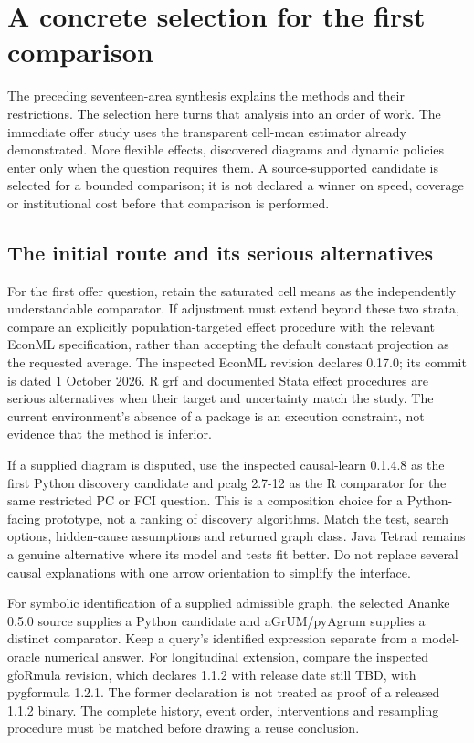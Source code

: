 \chapter{A concrete selection for the first comparison}
\label{rewrite:software-selection}

The preceding seventeen-area synthesis explains the methods and their
restrictions. The selection here turns that analysis into an order of work.
The immediate offer study uses the transparent cell-mean estimator already
demonstrated. More flexible effects, discovered diagrams and dynamic policies
enter only when the question requires them. A source-supported candidate is
selected for a bounded comparison; it is not declared a winner on speed,
coverage or institutional cost before that comparison is performed.

\section{The initial route and its serious alternatives}
For the first offer question, retain the saturated cell means as the
independently understandable comparator. If adjustment must extend beyond
these two strata, compare an explicitly population-targeted effect procedure
with the relevant EconML specification, rather than accepting the default
constant projection as the requested average. The inspected EconML revision
declares 0.17.0; its commit is dated 1 October 2026. R grf and documented
Stata effect procedures are serious alternatives when their target and
uncertainty match the study. The current environment's absence of a package
is an execution constraint, not evidence that the method is inferior.
\citep{exec19_econml_source,exec13_grf_rpath,exec13_ch_stata}

If a supplied diagram is disputed, use the inspected causal-learn 0.1.4.8
as the first Python discovery candidate and pcalg 2.7-12 as the R comparator
for the same restricted PC or FCI question. This is a composition choice
for a Python-facing prototype, not a ranking of discovery algorithms.
Match the test, search options, hidden-cause assumptions and returned graph
class. Java Tetrad remains a genuine alternative where its model and tests
fit better. Do not replace several causal explanations with one arrow
orientation to simplify the interface.
\citep{v12_sw_causallearn,exec13_pcalg_reuse_primary,exec13_java_tetrad}

For symbolic identification of a supplied admissible graph, the selected
Ananke 0.5.0 source supplies a Python candidate and aGrUM/pyAgrum supplies
a distinct comparator. Keep a query's identified expression separate from
a model-oracle numerical answer. For longitudinal extension, compare the
inspected gfoRmula revision, which declares 1.1.2 with release date still
TBD, with pygformula 1.2.1. The former declaration is not treated as proof
of a released 1.1.2 binary. The complete history, event order, interventions
and resampling procedure must be matched before drawing a reuse conclusion.
\citep{exec24_ananke_source,exec19_cxx_identification_source,
exec24_agrum_source,exec20_gformula_reuse,exec24_longpy_pygformula_source}

